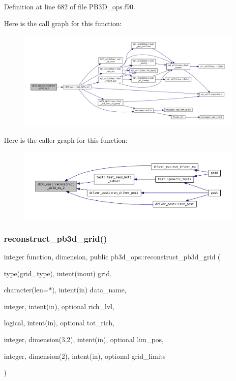 Definition at line 682 of file P\+B3\+D\+\_\+ops.\+f90.

Here is the call graph for this function\+:
\nopagebreak
\begin{figure}[H]
\begin{center}
\leavevmode
\includegraphics[width=350pt]{namespacepb3d__ops_a13280910f320a6835cd19e62fe238240_cgraph}
\end{center}
\end{figure}
Here is the caller graph for this function\+:
\nopagebreak
\begin{figure}[H]
\begin{center}
\leavevmode
\includegraphics[width=350pt]{namespacepb3d__ops_a13280910f320a6835cd19e62fe238240_icgraph}
\end{center}
\end{figure}
\mbox{\label{namespacepb3d__ops_a279af758fa95e678f6485c50e5bc4ffb}} 
\subsubsection{\texorpdfstring{reconstruct\+\_\+pb3d\+\_\+grid()}{reconstruct\_pb3d\_grid()}}
{\footnotesize\ttfamily integer function, dimension, public pb3d\+\_\+ops\+::reconstruct\+\_\+pb3d\+\_\+grid (\begin{DoxyParamCaption}\item[{type(grid\+\_\+type), intent(inout)}]{grid,  }\item[{character(len=$\ast$), intent(in)}]{data\+\_\+name,  }\item[{integer, intent(in), optional}]{rich\+\_\+lvl,  }\item[{logical, intent(in), optional}]{tot\+\_\+rich,  }\item[{integer, dimension(3,2), intent(in), optional}]{lim\+\_\+pos,  }\item[{integer, dimension(2), intent(in), optional}]{grid\+\_\+limits }\end{DoxyParamCaption})}



